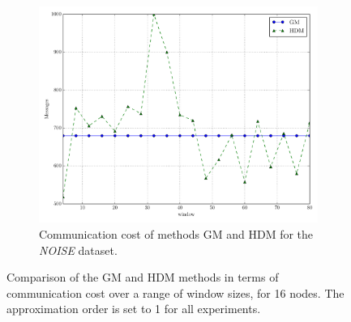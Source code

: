 \begin{figure}[!htb]
\begin{subfigure}{0.32\textwidth}%
  \includegraphics[width=\linewidth]{img/main_msg_noisyinterweaving_window.pdf}
  \caption{Communication cost of methods GM and HDM for the \emph{NOISE} dataset.}
\end{subfigure}
\vspace{0.5cm}
\caption{Comparison of the GM and HDM methods in terms of communication cost over a range of window sizes, for 16 nodes. The approximation order is set to 1 for all experiments.} \label{fig:mainComp-wl}
\end{figure}


